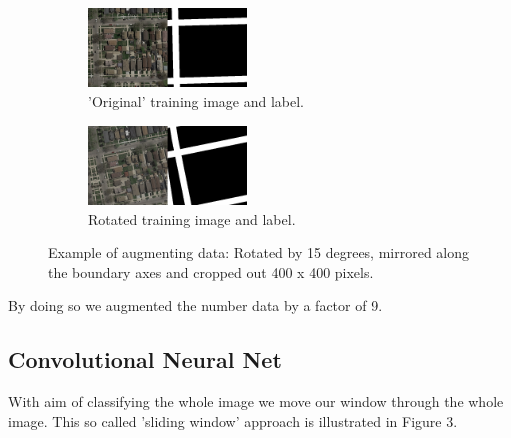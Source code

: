 \documentclass[10pt,conference,compsocconf]{IEEEtran}
\begin{document}
%



\begin{figure}[H]
	\centering
	\begin{subfigure}[htb]{0.2\textwidth}
		\includegraphics[width=4.2cm]{images/data_augment.png}
		\caption{'Original' training image and label.}
		\label{fig:dat}
	\end{subfigure}
	\hspace{1.5em}
	\begin{subfigure}[htb]{0.2\textwidth}
		\includegraphics[width=4.2cm]{images/data_augment_rot.png}
		\caption{Rotated training image and label.}
		\label{fig:datrot}
	\end{subfigure}
	\caption{Example of augmenting data: Rotated by 15 degrees, mirrored along the boundary axes and cropped out 400 x 400 pixels.}
\end{figure}

By doing so we augmented the number data by a factor of 9.



\subsection{Convolutional Neural Net}
\label{cnn}
With aim of classifying the whole image we move our window through the whole image. This so called 'sliding window' approach is illustrated in Figure 3.
\end{document}
